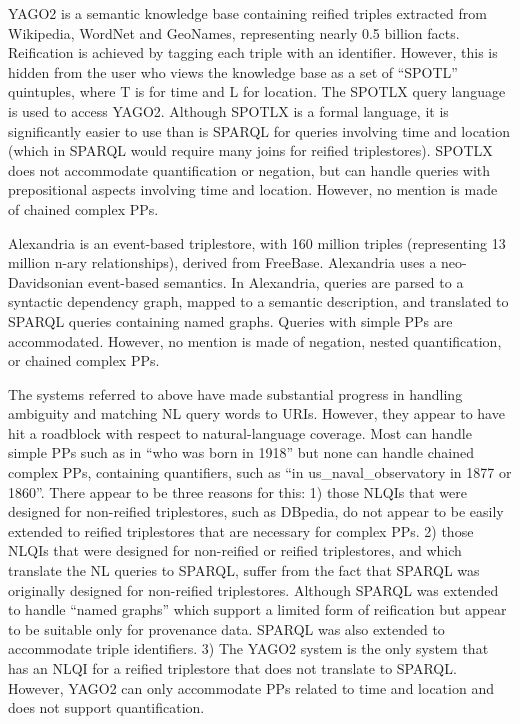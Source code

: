 \documentclass[../main.tex]{subfiles}
\begin{document}
\begin{refsection}
YAGO2 \cite{hoffart2013yago2} is a semantic knowledge base containing reified triples extracted from Wikipedia, WordNet and GeoNames, representing nearly 0.5 billion facts. Reification is achieved by tagging each triple with an identifier. However, this is hidden from the user who views the knowledge base as a set of ``SPOTL'' quintuples, where T is for time and L for location. The SPOTLX query language is used to access YAGO2. Although SPOTLX is a formal language, it is significantly easier to use than is SPARQL for queries involving time and location (which in SPARQL would require many joins for reified triplestores). SPOTLX does not accommodate quantification or negation, but can handle queries with prepositional aspects involving time and location. However, no mention is made of chained complex PPs.

Alexandria \cite{wendt2012linguistic} is an event-based triplestore, with 160 million triples (representing 13 million n-ary relationships), derived from FreeBase. Alexandria uses a neo-Davidsonian \cite{parsons1990events} event-based semantics. In Alexandria, queries are parsed to a syntactic dependency graph, mapped to a semantic description, and translated to SPARQL queries containing named graphs. Queries with simple PPs are accommodated. However, no mention is made of negation, nested quantification, or chained complex PPs.

The systems referred to above have made substantial progress in handling ambiguity and matching NL query words to URIs. However, they appear to have hit a roadblock with respect to natural-language coverage. Most can handle simple PPs such as in ``who was born in 1918'' but none can handle chained complex PPs, containing quantifiers, such as ``in us\_naval\_observatory in 1877 or 1860''. There appear to be three reasons for this: 1) those NLQIs that were designed for non-reified triplestores, such as DBpedia, do not appear to be easily extended to reified triplestores that are necessary for complex PPs. 2) those NLQIs that were designed for non-reified or reified triplestores, and which translate the NL queries to SPARQL, suffer from the fact that SPARQL was originally designed for non-reified triplestores.  Although SPARQL was extended to handle ``named graphs'' \cite{carroll2005named} which support a limited form of reification but appear to be suitable only for provenance data. SPARQL was also extended to accommodate triple identifiers. 3) The YAGO2 system is the only system that has an NLQI for a reified triplestore that does not translate to SPARQL. However, YAGO2 can only accommodate PPs related to time and location and does not support quantification.


\end{refsection}
\end{document}

